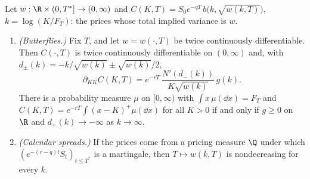 \begin{proposition}\label{prop:iv-static-arbitrage}
Let $w:\R\times(0,T^*]\to(0,\infty)$ and $C(K,T)=S_0e^{-qT}\,b\big(k,\sqrt{w(k,T)}\big)$, $k=\log(K/F_T)$:
the prices whose total implied variance is $w$.
\begin{enumerate}[label=(\roman*)]
  \item \emph{(Butterflies.)} Fix $T$, and let $w=w(\cdot,T)$ be twice continuously differentiable.
    Then $C(\cdot,T)$ is twice continuously differentiable on $(0,\infty)$ and, with
    $d_\pm(k)=-k/\sqrt{w(k)}\pm\sqrt{w(k)}/2$,
    \begin{equation}\label{eq:iv-density}
      \partial_{KK}C(K,T)=e^{-rT}\,\frac{N'(d_-(k))}{K\sqrt{w(k)}}\,g(k).
    \end{equation}
    There is a probability measure $\mu$ on $[0,\infty)$ with $\int x\,\mu(\dd x)=F_T$ and
    $C(K,T)=e^{-rT}\int(x-K)^+\mu(\dd x)$ for all $K>0$ if and only if $g\ge0$ on $\R$ and
    $d_+(k)\to-\infty$ as $k\to\infty$.
  \item \emph{(Calendar spreads.)} If the prices come from a pricing measure $\Q$ under which
    $(e^{-(r-q)t}S_t)_{t\le T^*}$ is a martingale, then $T\mapsto w(k,T)$ is nondecreasing for every $k$.
\end{enumerate}
\end{proposition}


